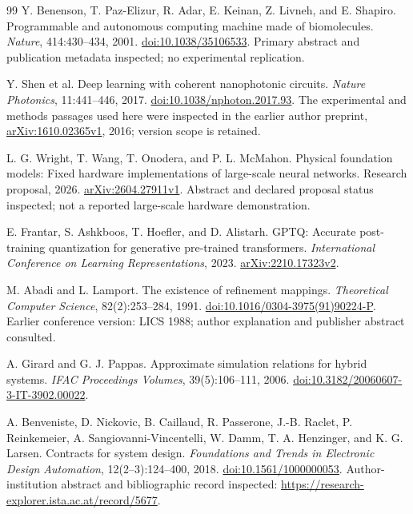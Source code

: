 \documentclass[11pt,a4paper]{article}
\theoremstyle{definition}
\theoremstyle{remark}
\begin{document}
\begin{thebibliography}{99}
Y. Benenson, T. Paz-Elizur, R. Adar, E. Keinan, Z. Livneh, and E. Shapiro. Programmable and autonomous computing machine made of biomolecules. \emph{Nature}, 414:430--434, 2001. \href{https://doi.org/10.1038/35106533}{doi:10.1038/35106533}. Primary abstract and publication metadata inspected; no experimental replication.

Y. Shen et al. Deep learning with coherent nanophotonic circuits. \emph{Nature Photonics}, 11:441--446, 2017. \href{https://doi.org/10.1038/nphoton.2017.93}{doi:10.1038/nphoton.2017.93}. The experimental and methods passages used here were inspected in the earlier author preprint, \href{https://arxiv.org/abs/1610.02365}{arXiv:1610.02365v1}, 2016; version scope is retained.

L. G. Wright, T. Wang, T. Onodera, and P. L. McMahon. Physical foundation models: Fixed hardware implementations of large-scale neural networks. Research proposal, 2026. \href{https://arxiv.org/abs/2604.27911}{arXiv:2604.27911v1}. Abstract and declared proposal status inspected; not a reported large-scale hardware demonstration.

E. Frantar, S. Ashkboos, T. Hoefler, and D. Alistarh. GPTQ: Accurate post-training quantization for generative pre-trained transformers. \emph{International Conference on Learning Representations}, 2023. \href{https://arxiv.org/abs/2210.17323}{arXiv:2210.17323v2}.

M. Abadi and L. Lamport. The existence of refinement mappings. \emph{Theoretical Computer Science}, 82(2):253--284, 1991. \href{https://doi.org/10.1016/0304-3975(91)90224-P}{doi:10.1016/0304-3975(91)90224-P}. Earlier conference version: LICS 1988; author explanation and publisher abstract consulted.

A. Girard and G. J. Pappas. Approximate simulation relations for hybrid systems. \emph{IFAC Proceedings Volumes}, 39(5):106--111, 2006. \href{https://doi.org/10.3182/20060607-3-IT-3902.00022}{doi:10.3182/20060607-3-IT-3902.00022}.

A. Benveniste, D. Nickovic, B. Caillaud, R. Passerone, J.-B. Raclet, P. Reinkemeier, A. Sangiovanni-Vincentelli, W. Damm, T. A. Henzinger, and K. G. Larsen. Contracts for system design. \emph{Foundations and Trends in Electronic Design Automation}, 12(2--3):124--400, 2018. \href{https://doi.org/10.1561/1000000053}{doi:10.1561/1000000053}. Author-institution abstract and bibliographic record inspected: \url{https://research-explorer.ista.ac.at/record/5677}.

\end{thebibliography}
\end{document}
